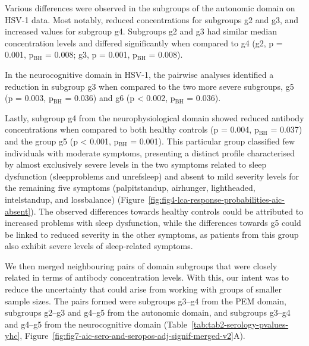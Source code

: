 Various differences were observed in the subgroups of the autonomic domain on HSV-1 data.
Most notably, reduced concentrations for subgroups g2 and g3, and increased values for subgroup g4.
Subgroups g2 and g3 had similar median concentration levels and differed significantly when compared to g4 (g2, p = 0.001, p$_{\text{BH}}$ = 0.008; g3, p = 0.001, p$_{\text{BH}}$ = 0.008).

In the neurocognitive domain in HSV-1, the pairwise analyses identified a reduction in subgroup g3 when compared to the two more severe subgroups, g5 (p = 0.003, p$_{\text{BH}}$ = 0.036) and g6 (p < 0.002, p$_{\text{BH}}$ = 0.036).

Lastly, subgroup g4 from the neurophysiological domain showed reduced antibody concentrations when compared to both healthy controls (p = 0.004, p$_{\text{BH}}$ = 0.037) and the group g5 (p < 0.001, p$_{\text{BH}}$ = 0.001).
This particular group classified few individuals with moderate symptoms, presenting a distinct profile characterised by almost exclusively severe levels in the two symptoms related to sleep dysfunction (sleepproblems and unrefsleep) and absent to mild severity levels for the remaining five symptoms (palpitstandup, airhunger, lightheaded, intelstandup, and lossbalance) (Figure~\ref{fig:fig4-lca-response-probabilities-aic-absent}).
The observed differences towards healthy controls could be attributed to increased problems with sleep dysfunction, while the differences towards g5 could be linked to reduced severity in the other symptoms, as patients from this group also exhibit severe levels of sleep-related symptoms.

\bsni
We then merged neighbouring pairs of domain subgroups that were closely related in terms of antibody concentration levels.
With this, our intent was to reduce the uncertainty that could arise from working with groups of smaller sample sizes.
The pairs formed were subgroups g3--g4 from the PEM domain, subgroups g2--g3 and g4--g5 from the autonomic domain, and subgroups g3--g4 and g4--g5 from the neurocognitive domain (Table~\ref{tab:tab2-serology-pvalues-yhc}, Figure~\ref{fig:fig7-aic-sero-and-seropos-adj-signif-merged-v2}A).


